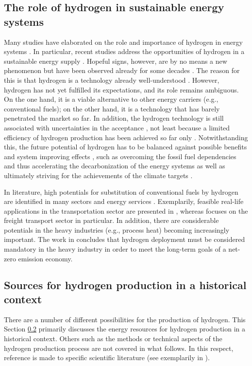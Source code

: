 \documentclass[review]{elsarticle}
\begin{document}
\subsection{The role of hydrogen in sustainable energy systems}\label{state1}
Many studies have elaborated on the role and importance of hydrogen in energy systems \cite{midilli2005hydrogen}. In particular, recent studies address the opportunities of hydrogen in a sustainable energy supply \cite{moller2017hydrogen}. Hopeful signs, however, are by no means a new phenomenon but have been observed already for some decades \cite{dunn2002hydrogen}. The reason for this is that hydrogen is a technology already well-understood \cite{momirlan2002current}. However, hydrogen has not yet fulfilled its expectations, and its role remains ambiguous. On the one hand, it is a viable alternative to other energy carriers \cite{johnston2005hydrogen} (e.g., conventional fuels); on the other hand, it is a technology that has barely penetrated the market so far. In addition, the hydrogen technology is still associated with uncertainties in the acceptance \cite{da2017hydrogen}, not least because a limited efficiency of hydrogen production has been achieved so far only \cite{page2009system}. Notwithstanding this, the future potential of hydrogen has to be balanced against possible benefits and system improving effects \cite{mcpherson2018role}, such as overcoming the fossil fuel dependencies and thus accelerating the decarbonization of the energy systems \cite{lux2020supply} as well as ultimately striving for the achievements of the climate targets \cite{chapman2020societal}.\vspace{0.3cm}

In literature, high potentials for substitution of conventional fuels by hydrogen are identified in many sectors \cite{burandt2019decarbonizing} and energy services \cite{mouli2021mapping}. Exemplarily, feasible real-life applications in the transportation sector are presented in \cite{zhang2016times}, whereas \cite{auer2020development} focuses on the freight transport sector in particular. In addition, there are considerable potentials in the heavy industries (e.g., process heat) becoming increasingly important. The work in \cite{rissman2020technologies} concludes that hydrogen deployment must be considered mandatory in the heavy industry in order to meet the long-term goals of a net-zero emission economy. 


\subsection{Sources for hydrogen production in a historical context}\label{state2}
There are a number of different possibilities for the production of hydrogen. This Section \ref{state2} primarily discusses the energy resources for hydrogen production in a historical context. Others such as the methods or technical aspects of the hydrogen production process are not covered in what follows. In this respect, reference is made to specific scientific literature (see exemplarily in \cite{dincer2015review}).\vspace{0.3cm}
\end{document}
